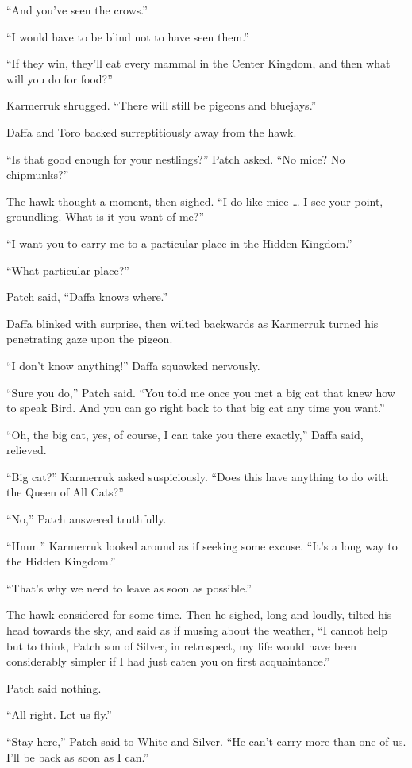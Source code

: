 \documentclass[12pt]{memoir}
\begin{document}
“And you’ve seen the crows.”

“I would have to be blind not to have seen them.”

“If they win, they’ll eat every mammal in the Center Kingdom, and then
what will you do for food?”

Karmerruk shrugged. “There will still be pigeons and bluejays.”

Daffa and Toro backed surreptitiously away from the hawk.

“Is that good enough for your nestlings?” Patch asked. “No mice? No
chipmunks?”

The hawk thought a moment, then sighed. “I do like mice … I see your
point, groundling. What is it you want of me?”

“I want you to carry me to a particular place in the Hidden Kingdom.”

“What particular place?”

Patch said, “Daffa knows where.”

Daffa blinked with surprise, then wilted backwards as Karmerruk turned
his penetrating gaze upon the pigeon.

“I don’t know anything!” Daffa squawked nervously.

“Sure you do,” Patch said. “You told me once you met a big cat that
knew how to speak Bird. And you can go right back to that big cat any
time you want.”

“Oh, the big cat, yes, of course, I can take you there exactly,” Daffa
said, relieved.

“Big cat?” Karmerruk asked suspiciously. “Does this have anything to
do with the Queen of All Cats?”

“No,” Patch answered truthfully.

“Hmm.” Karmerruk looked around as if seeking some excuse. “It’s a long
way to the Hidden Kingdom.”

“That’s why we need to leave as soon as possible.”

The hawk considered for some time. Then he sighed, long and loudly,
tilted his head towards the sky, and said as if musing about the
weather, “I cannot help but to think, Patch son of Silver, in
retrospect, my life would have been considerably simpler if I had just
eaten you on first acquaintance.”

Patch said nothing.

“All right. Let us fly.”

“Stay here,” Patch said to White and Silver. “He can’t carry more than
one of us. I’ll be back as soon as I can.”
\end{document}
